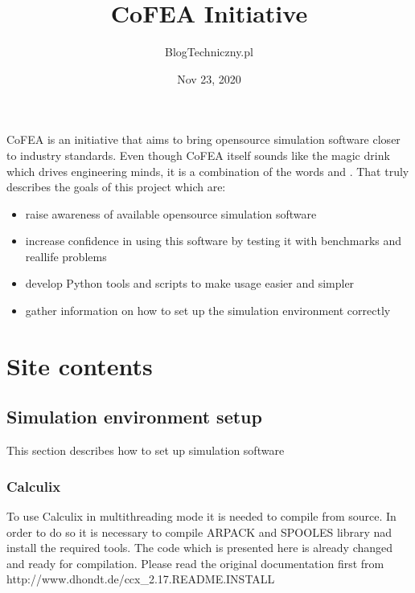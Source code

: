 \documentclass[letterpaper,10pt,english]{sphinxmanual}
\title{CoFEA Initiative}
\date{Nov 23, 2020}
\author{BlogTechniczny.pl}
\let\sphinxpxdimen\pdfpxdimen\else\newdimen\sphinxpxdimen
\begin{document}
\pagestyle{empty}
\sphinxmaketitle
\pagestyle{plain}
\sphinxtableofcontents
\pagestyle{normal}
\label{\detokenize{index::doc}}
\begin{figure}[htbp]
\centering

\noindent\sphinxincludegraphics[width=400\sphinxpxdimen]{{cofea-logo}.png}
\end{figure}



CoFEA is an initiative that aims to bring open\sphinxhyphen{}source simulation software closer to industry standards. Even though CoFEA itself sounds like the magic drink which drives engineering minds, it is a combination of the words  and . That truly describes the goals of this project which are:
\begin{itemize}
\item {} 
raise awareness of available open\sphinxhyphen{}source simulation software

\item {} 
increase confidence in using this software by testing it with benchmarks and real\sphinxhyphen{}life problems

\item {} 
develop Python tools and scripts to make usage easier and simpler

\item {} 
gather information on how to set up the simulation environment correctly

\end{itemize}


\chapter{Site contents}
\label{\detokenize{index:site-contents}}

\section{Simulation environment setup}
\label{\detokenize{software_setup/index:simulation-environment-setup}}\label{\detokenize{software_setup/index::doc}}
This section describes how to set up simulation software


\subsection{Calculix}
\label{\detokenize{software_setup/calculix:calculix}}\label{\detokenize{software_setup/calculix::doc}}
To use Calculix in multithreading mode it is needed to compile from source. In order to do so it is necessary to compile ARPACK and SPOOLES library nad install the required tools. The code which is presented here is already changed and ready for compilation. Please read the original documentation first from http://www.dhondt.de/ccx\_2.17.README.INSTALL
\end{document}
